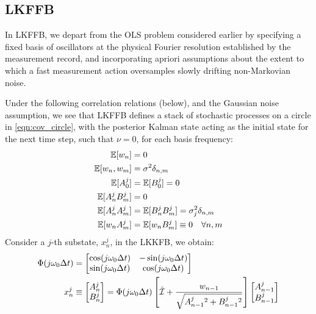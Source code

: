 \subsection{LKFFB}
 In LKFFB, we depart from the OLS problem considered earlier by specifying a fixed basis of oscillators at the physical Fourier resolution established by the measurement record, and incorporating apriori assumptions about the extent to which a fast measurement action oversamples slowly drifting non-Markovian noise.  

Under the following correlation relations (below), and the Gaussian noise assumption, we see that LKFFB defines a stack of stochastic processes on a circle in \cref{eqn:cov_circle}, with the posterior Kalman state acting as the initial state for the next time step, such that $\nu = 0$, for each basis frequency:
 \begin{align}
 \mathbb{E}[w_n] &= 0 \\
\mathbb{E}[w_n,w_m] &= \sigma^2 \delta_{n,m}  \\
\mathbb{E}[A^j_0] &=\mathbb{E}[B^j_0] = 0 \\
\mathbb{E}[A^j_n B^j_m] &= 0 \\
\mathbb{E}[A^j_n A^j_m] &= \mathbb{E}[B^j_n B^j_m] = \sigma_j^2 \delta_{n,m} \\
\mathbb{E}[w_n A^j_m] &= \mathbb{E}[w_n B^j_m] \equiv 0 \quad  \forall n, m \\
\end{align}
Consider a $j$-th substate, $x^j_n$, in the LKKFB, we obtain:
\begin{align}
\Phi(j \omega_0 \Delta t) &= \begin{bmatrix} \cos(j \omega_0 \Delta t) & -\sin(j \omega_0 \Delta t) \\ \sin(j \omega_0 \Delta t) & \cos(j \omega_0 \Delta t) \\ \end{bmatrix} \\
x^j_n & \equiv \begin{bmatrix} A^j_{n} \\ B^j_{n} \\ \end{bmatrix} = \Phi(j \omega_0 \Delta t) \left[\hat{\mathcal{I}} + \frac{w_{n-1}}{\sqrt{A^j_{n-1}{}^2 + B^j_{n-1}{}^2}} \right] \begin{bmatrix} A^j_{n-1} \\ B^j_{n-1} \\ \end{bmatrix} \\
\end{align}

